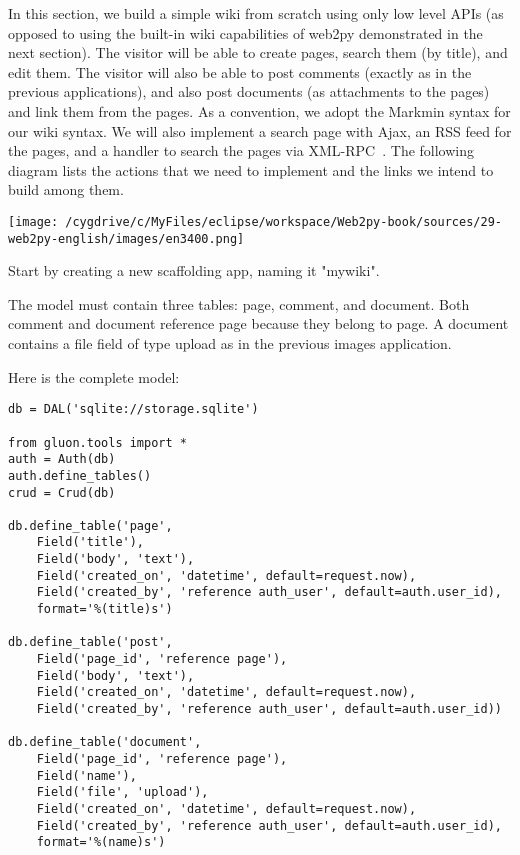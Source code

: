 \documentclass[justified,sixbynine,notoc]{tufte-book}
\def\inxx#1{\index{#1}}
\begin{document}
\begin{fullwidth}
\inxx{wiki} \inxx{RSS} \inxx{Ajax} \inxx{XMLRPC}

In this section, we build a simple wiki from scratch using only low level APIs (as opposed to using the built-in wiki capabilities of web2py demonstrated in the next section). The visitor will be able to create pages, search them (by title), and edit them. The visitor will also be able to post comments (exactly as in the previous applications), and also post documents (as attachments to the pages) and link them from the pages. As a convention, we adopt the Markmin syntax for our wiki syntax. We will also implement a search page with Ajax, an RSS feed for the pages, and a handler to search the pages via XML-RPC~\cite{xmlrpc}. The following diagram lists the actions that we need to implement and the links we intend to build among them.


\goodbreak\begin{center}\texttt{[image: /cygdrive/c/MyFiles/eclipse/workspace/Web2py-book/sources/29-web2py-english/images/en3400.png]}\end{center}


Start by creating a new scaffolding app, naming it "mywiki".

The model must contain three tables: page, comment, and document. Both comment and document reference page because they belong to page. A document contains a file field of type upload as in the previous images application.

Here is the complete model:
\begin{lstlisting}
db = DAL('sqlite://storage.sqlite')

from gluon.tools import *
auth = Auth(db)
auth.define_tables()
crud = Crud(db)

db.define_table('page',
    Field('title'),
    Field('body', 'text'),
    Field('created_on', 'datetime', default=request.now),
    Field('created_by', 'reference auth_user', default=auth.user_id),
    format='%(title)s')

db.define_table('post',
    Field('page_id', 'reference page'),
    Field('body', 'text'),
    Field('created_on', 'datetime', default=request.now),
    Field('created_by', 'reference auth_user', default=auth.user_id))

db.define_table('document',
    Field('page_id', 'reference page'),
    Field('name'),
    Field('file', 'upload'),
    Field('created_on', 'datetime', default=request.now),
    Field('created_by', 'reference auth_user', default=auth.user_id),
    format='%(name)s')


\end{lstlisting}
\end{fullwidth}
\end{document}
